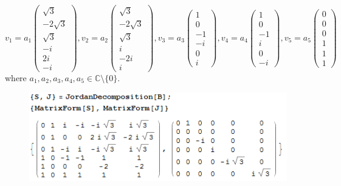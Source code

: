 \documentclass[a4paper,12pt,titlepage]{article}
\begin{document}
$v_1=a_1\begin{pmatrix}
\sqrt{3}\\
-2\sqrt{3}\\
\sqrt{3}\\
-i\\
2i\\
-i
\end{pmatrix},v_2=a_2\begin{pmatrix}
\sqrt{3}\\
-2\sqrt{3}\\
\sqrt{3}\\
i\\
-2i\\
i
\end{pmatrix},v_3=a_3\begin{pmatrix}
1\\
0\\
-1\\
-i\\
0\\
i
\end{pmatrix},v_4=a_4\begin{pmatrix}
1\\
0\\
-1\\
i\\
0\\
-i
\end{pmatrix},v_5=a_5\begin{pmatrix}
0\\
0\\
0\\
1\\
1\\
1
\end{pmatrix}$ where $a_1,a_2,a_3,a_4,a_5\in\mathbb{C}\setminus\lbrace0\rbrace$.

\begin{figure}[H]
    \centering
    \includegraphics[width=14cm]{3.png}
\end{figure}
\end{document}
